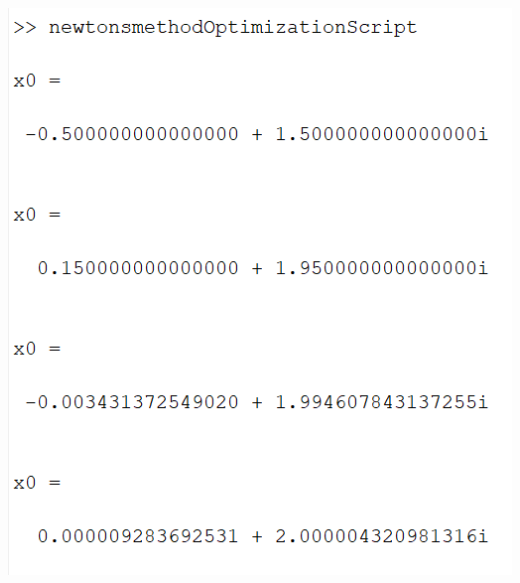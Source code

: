 \documentclass{article}
\begin{document}
    \begin{center}
        \includegraphics[scale = 0.75]{complex root convergence}
    \end{center}
\end{document}
